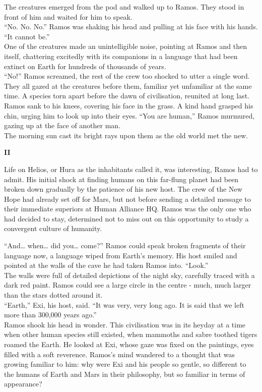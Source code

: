 The creatures emerged from the pod and walked up to Ramos. They stood in front of him and waited for him to speak.\\
“No. No. No.” Ramos was shaking his head and pulling at his face with his hands. “It cannot be.”\\
One of the creatures made an unintelligible noise, pointing at Ramos and then itself, chattering excitedly with its companions in a language that had been extinct on Earth for hundreds of thousands of years.\\
“No!” Ramos screamed, the rest of the crew too shocked to utter a single word. They all gazed at the creatures before them, familiar yet unfamiliar at the same time. A species torn apart before the dawn of civilisation, reunited at long last.\\
Ramos sank to his knees, covering his face in the grass. A kind hand grasped his chin, urging him to look up into their eyes.
“You are human,” Ramos murmured, gazing up at the face of another man.\\
The morning sun cast its bright rays upon them as the old world met the new.

\begin{center}
\Large \textbf{II}
\end{center}


Life on Helios, or Hura as the inhabitants called it, was interesting, Ramos had to admit. His initial shock at finding humans on this far-flung planet had been broken down gradually by the patience of his new host. The crew of the New Hope had already set off for Mars, but not before sending a detailed message to their immediate superiors at Human Alliance HQ. Ramos was the only one who had decided to stay, determined not to miss out on this opportunity to study a convergent culture of humanity.

“And… when… did you… come?” Ramos could speak broken fragments of their language now, a language wiped from Earth’s memory.
His host smiled and pointed at the walls of the cave he had taken Ramos into. “Look.”\\
The walls were full of detailed depictions of the night sky, carefully traced with a dark red paint. Ramos could see a large circle in the centre - much, much larger than the stars dotted around it.\\
“Earth,” Exi, his host, said. “It was very, very long ago. It is said that we left more than 300,000 years ago.”\\
Ramos shook his head in wonder. This civilisation was in its heyday at a time when other human species still existed, when mammoths and sabre toothed tigers roamed the Earth. He looked at Exi, whose gaze was fixed on the paintings, eyes filled with a soft reverence. Ramos’s mind wandered to a thought that was growing familiar to him: why were Exi and his people so gentle, so different to the humans of Earth and Mars in their philosophy, but so familiar in terms of appearance?

